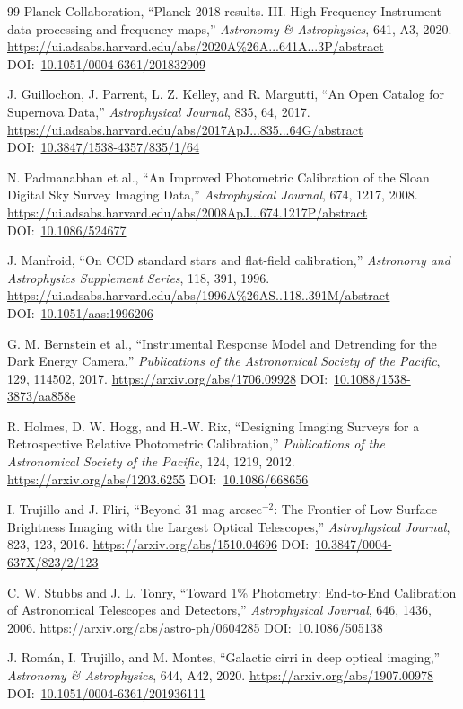 \documentclass[10pt,onecolumn]{article}
\newcommand{\doi}[1]{DOI:~\href{https://doi.org/#1}{#1}}
\begin{document}
\begin{thebibliography}{99}
Planck Collaboration,
``Planck 2018 results. III. High Frequency Instrument data processing and frequency maps,''
\emph{Astronomy \& Astrophysics}, 641, A3, 2020.
\url{https://ui.adsabs.harvard.edu/abs/2020A\%26A...641A...3P/abstract}
\doi{10.1051/0004-6361/201832909}

J. Guillochon, J. Parrent, L. Z. Kelley, and R. Margutti,
``An Open Catalog for Supernova Data,''
\emph{Astrophysical Journal}, 835, 64, 2017.
\url{https://ui.adsabs.harvard.edu/abs/2017ApJ...835...64G/abstract}
\doi{10.3847/1538-4357/835/1/64}

N. Padmanabhan et al.,
``An Improved Photometric Calibration of the Sloan Digital Sky Survey Imaging Data,''
\emph{Astrophysical Journal}, 674, 1217, 2008.
\url{https://ui.adsabs.harvard.edu/abs/2008ApJ...674.1217P/abstract}
\doi{10.1086/524677}

J. Manfroid,
``On CCD standard stars and flat-field calibration,''
\emph{Astronomy and Astrophysics Supplement Series}, 118, 391, 1996.
\url{https://ui.adsabs.harvard.edu/abs/1996A%26AS..118..391M/abstract}
\doi{10.1051/aas:1996206}

G. M. Bernstein et al.,
``Instrumental Response Model and Detrending for the Dark Energy Camera,''
\emph{Publications of the Astronomical Society of the Pacific}, 129, 114502, 2017.
\url{https://arxiv.org/abs/1706.09928}
\doi{10.1088/1538-3873/aa858e}

R. Holmes, D. W. Hogg, and H.-W. Rix,
``Designing Imaging Surveys for a Retrospective Relative Photometric Calibration,''
\emph{Publications of the Astronomical Society of the Pacific}, 124, 1219, 2012.
\url{https://arxiv.org/abs/1203.6255}
\doi{10.1086/668656}

I. Trujillo and J. Fliri,
``Beyond 31 mag arcsec$^{-2}$: The Frontier of Low Surface Brightness Imaging with the Largest Optical Telescopes,''
\emph{Astrophysical Journal}, 823, 123, 2016.
\url{https://arxiv.org/abs/1510.04696}
\doi{10.3847/0004-637X/823/2/123}

C. W. Stubbs and J. L. Tonry,
``Toward 1\% Photometry: End-to-End Calibration of Astronomical Telescopes and Detectors,''
\emph{Astrophysical Journal}, 646, 1436, 2006.
\url{https://arxiv.org/abs/astro-ph/0604285}
\doi{10.1086/505138}

J. Rom\'an, I. Trujillo, and M. Montes,
``Galactic cirri in deep optical imaging,''
\emph{Astronomy \& Astrophysics}, 644, A42, 2020.
\url{https://arxiv.org/abs/1907.00978}
\doi{10.1051/0004-6361/201936111}


\end{thebibliography}
\end{document}
